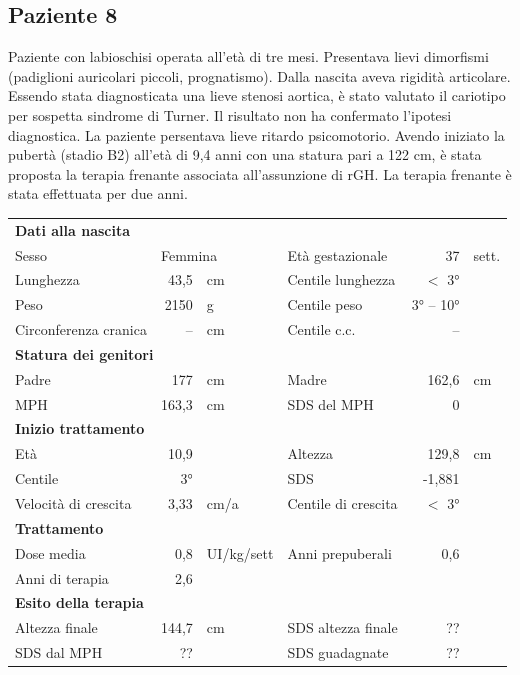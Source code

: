 \subsection*{Paziente 8}%


Paziente con labioschisi operata all'età di tre mesi. Presentava lievi dimorfismi (padiglioni auricolari piccoli, prognatismo). Dalla nascita aveva rigidità articolare. Essendo stata diagnosticata una lieve stenosi aortica, è stato valutato il cariotipo per sospetta sindrome di Turner. Il risultato non ha confermato l'ipotesi diagnostica. La paziente persentava lieve ritardo psicomotorio. 
Avendo iniziato la pubertà (stadio B2) all'età di 9,4 anni con una statura pari a 122 cm, è stata proposta la terapia frenante associata all'assunzione di rGH. La terapia frenante è stata effettuata per due anni.


\begin{table}[!h]
\begin{tabular}{lrllrl}
\toprule
\multicolumn{6}{l}{\textbf{Dati alla nascita}}\\
Sesso 		& \multicolumn{2}{l}{Femmina} 	& Età gestazionale 		& 37 		& sett.\\
Lunghezza 	& 43,5 		& cm 				& Centile lunghezza		& $<$ 3° 		\\
Peso 		& 2150 		& g					& Centile peso			& 3° -- 10°		\\
Circonferenza cranica	& -- 		& cm 	& Centile c.c.			& -- \\
\midrule
\multicolumn{6}{l}{\textbf{Statura dei genitori}}\\
Padre 		& 177 & cm 	& Madre 				& 162,6 & cm \\
MPH 		& 163,3 & cm 	& SDS del MPH 			& 0\\
\midrule
\multicolumn{6}{l}{\textbf{Inizio trattamento}} \\
Età	& 10,9 & 		& Altezza 				& 129,8 & cm  \\
Centile & $~$ 3°	 &		& SDS		& -1,881 \\
Velocità di crescita & 3,33 & cm/a	& Centile di crescita & $<$ 3°\\
\midrule
\multicolumn{6}{l}{\textbf{Trattamento}} \\
Dose media		& 0,8 & UI/kg/sett & Anni prepuberali & 0,6\\
Anni di terapia & 2,6\\
\midrule
\multicolumn{6}{l}{\textbf{Esito della terapia}} \\
Altezza finale			& 144,7 & cm 	& SDS altezza finale		& ??\\
SDS dal MPH				& ?? &		& SDS guadagnate 			& ??\\
\bottomrule
\end{tabular}
\end{table}
\clearpage


